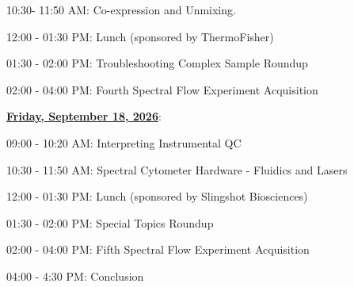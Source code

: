 \documentclass[
  letterpaper,
  DIV=11,
  numbers=noendperiod]{scrartcl}
\begin{document}
10:30- 11:50 AM: Co-expression and Unmixing.

12:00 - 01:30 PM: Lunch (sponsored by ThermoFisher)

01:30 - 02:00 PM: Troubleshooting Complex Sample Roundup

02:00 - 04:00 PM: Fourth Spectral Flow Experiment Acquisition

\ul{\textbf{Friday, September 18, 2026}}:

09:00 - 10:20 AM: Interpreting Instrumental QC

10:30 - 11:50 AM: Spectral Cytometer Hardware - Fluidics and Lasers

12:00 - 01:30 PM: Lunch (sponsored by Slingshot Biosciences)

01:30 - 02:00 PM: Special Topics Roundup

02:00 - 04:00 PM: Fifth Spectral Flow Experiment Acquisition

04:00 - 4:30 PM: Conclusion
\end{document}
